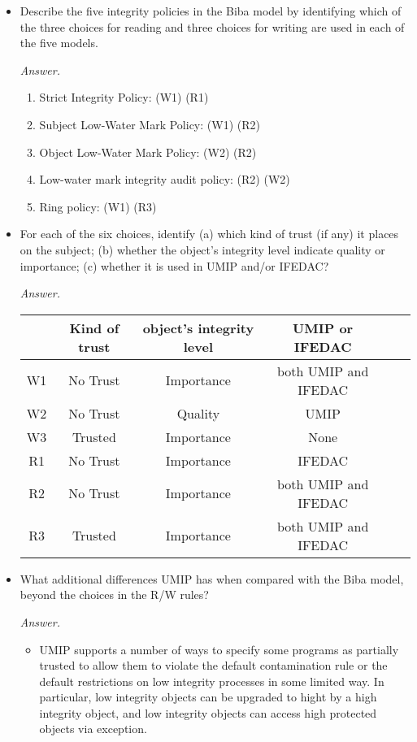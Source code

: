 \documentclass[11pt]{article}
\begin{document}
\begin{description}
{\bf
\begin{itemize}
 \item
Describe the five integrity policies in the Biba model by identifying which of the three choices for reading and three choices for writing are used in each of the five models.
\begin{mdframed}
	\textit{Answer. } 
	\begin{enumerate}
		\item Strict Integrity Policy: (W1) (R1)
		\item Subject Low-Water Mark Policy: (W1) (R2)
		\item Object Low-Water Mark Policy: (W2) (R2)
		\item Low-water mark integrity audit policy: (R2) (W2)  
		\item Ring policy: (W1) (R3)
	\end{enumerate}
\end{mdframed}
 \item
For each of the six choices, identify (a) which kind of trust (if any) it places on the subject; (b) whether the object's integrity level indicate quality or importance; (c) whether it is used in UMIP and/or IFEDAC?
\begin{mdframed}
	\textit{Answer. } 
	\\
	\begin{tabular}{|c|c|c|c|c|c|}
		\hline
		   & Kind of trust & object's integrity level & UMIP or IFEDAC \\ 
		\hline
		W1 & No Trust      & Importance & both UMIP and IFEDAC \\
		\hline
		W2 & No Trust      & Quality    & UMIP \\
		\hline
		W3 & Trusted       & Importance & None \\
		\hline
		R1 & No Trust      & Importance & IFEDAC \\
		\hline
		R2 & No Trust      & Importance & both UMIP and IFEDAC \\
		\hline
		R3 & Trusted       & Importance & both UMIP and IFEDAC \\
		\hline
	\end{tabular}
\end{mdframed}
 \item
What additional differences UMIP has when compared with the Biba model, beyond the choices in the R/W rules?
\begin{mdframed}
	\textit{Answer. } 
	\begin{itemize}
		\item UMIP supports a number of ways to specify some programs as partially trusted to allow them to violate the default contamination rule or the default restrictions on low integrity processes in some limited way. In particular, low integrity objects can be upgraded to hight by a high integrity object, and low integrity objects can access high protected objects via exception.

\end{itemize}
\end{mdframed}
\end{itemize}}
\end{description}
\end{document}

